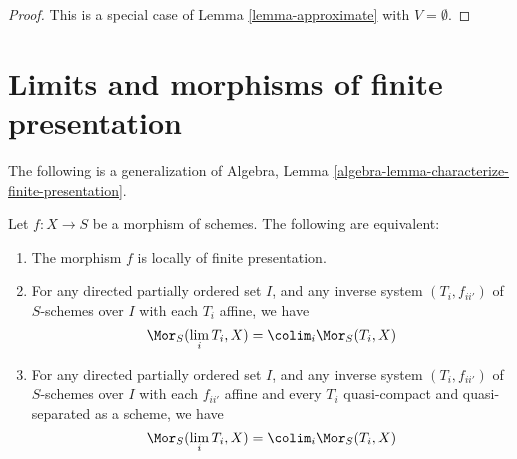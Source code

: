 \begin{proof}
This is a special case of Lemma \ref{lemma-approximate}
with $V = \emptyset$.
\end{proof}






\section{Limits and morphisms of finite presentation}
\label{section-finite-presentation}

\noindent
The following is a generalization of
Algebra, Lemma \ref{algebra-lemma-characterize-finite-presentation}.

\begin{proposition}
\label{proposition-characterize-locally-finite-presentation}
Let $f : X \to S$ be a morphism of schemes.
The following are equivalent:
\begin{enumerate}
\item The morphism $f$ is locally of finite presentation.
\item For any directed partially ordered set $I$, and any
inverse system $(T_i, f_{ii'})$ of $S$-schemes over $I$
with each $T_i$ affine, we have
$$
\Mor_S(\lim_i T_i, X) =
\colim_i \Mor_S(T_i, X)
$$
\item For any directed partially ordered set $I$, and any
inverse system $(T_i, f_{ii'})$ of $S$-schemes over $I$
with each $f_{ii'}$ affine and every $T_i$ quasi-compact and
quasi-separated as a scheme, we have
$$
\Mor_S(\lim_i T_i, X) =
\colim_i \Mor_S(T_i, X)
$$
\end{enumerate}
\end{proposition}

